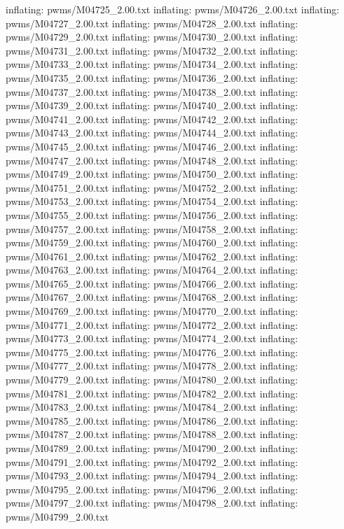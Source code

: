 \documentclass[letterpaper,10pt,english]{sphinxmanual}
\begin{document}
{\begin{sphinxVerbatim}[commandchars=\\\{\}]
  inflating: pwms/M04725\_2.00.txt
  inflating: pwms/M04726\_2.00.txt
  inflating: pwms/M04727\_2.00.txt
  inflating: pwms/M04728\_2.00.txt
  inflating: pwms/M04729\_2.00.txt
  inflating: pwms/M04730\_2.00.txt
  inflating: pwms/M04731\_2.00.txt
  inflating: pwms/M04732\_2.00.txt
  inflating: pwms/M04733\_2.00.txt
  inflating: pwms/M04734\_2.00.txt
  inflating: pwms/M04735\_2.00.txt
  inflating: pwms/M04736\_2.00.txt
  inflating: pwms/M04737\_2.00.txt
  inflating: pwms/M04738\_2.00.txt
  inflating: pwms/M04739\_2.00.txt
  inflating: pwms/M04740\_2.00.txt
  inflating: pwms/M04741\_2.00.txt
  inflating: pwms/M04742\_2.00.txt
  inflating: pwms/M04743\_2.00.txt
  inflating: pwms/M04744\_2.00.txt
  inflating: pwms/M04745\_2.00.txt
  inflating: pwms/M04746\_2.00.txt
  inflating: pwms/M04747\_2.00.txt
  inflating: pwms/M04748\_2.00.txt
  inflating: pwms/M04749\_2.00.txt
  inflating: pwms/M04750\_2.00.txt
  inflating: pwms/M04751\_2.00.txt
  inflating: pwms/M04752\_2.00.txt
  inflating: pwms/M04753\_2.00.txt
  inflating: pwms/M04754\_2.00.txt
  inflating: pwms/M04755\_2.00.txt
  inflating: pwms/M04756\_2.00.txt
  inflating: pwms/M04757\_2.00.txt
  inflating: pwms/M04758\_2.00.txt
  inflating: pwms/M04759\_2.00.txt
  inflating: pwms/M04760\_2.00.txt
  inflating: pwms/M04761\_2.00.txt
  inflating: pwms/M04762\_2.00.txt
  inflating: pwms/M04763\_2.00.txt
  inflating: pwms/M04764\_2.00.txt
  inflating: pwms/M04765\_2.00.txt
  inflating: pwms/M04766\_2.00.txt
  inflating: pwms/M04767\_2.00.txt
  inflating: pwms/M04768\_2.00.txt
  inflating: pwms/M04769\_2.00.txt
  inflating: pwms/M04770\_2.00.txt
  inflating: pwms/M04771\_2.00.txt
  inflating: pwms/M04772\_2.00.txt
  inflating: pwms/M04773\_2.00.txt
  inflating: pwms/M04774\_2.00.txt
  inflating: pwms/M04775\_2.00.txt
  inflating: pwms/M04776\_2.00.txt
  inflating: pwms/M04777\_2.00.txt
  inflating: pwms/M04778\_2.00.txt
  inflating: pwms/M04779\_2.00.txt
  inflating: pwms/M04780\_2.00.txt
  inflating: pwms/M04781\_2.00.txt
  inflating: pwms/M04782\_2.00.txt
  inflating: pwms/M04783\_2.00.txt
  inflating: pwms/M04784\_2.00.txt
  inflating: pwms/M04785\_2.00.txt
  inflating: pwms/M04786\_2.00.txt
  inflating: pwms/M04787\_2.00.txt
  inflating: pwms/M04788\_2.00.txt
  inflating: pwms/M04789\_2.00.txt
  inflating: pwms/M04790\_2.00.txt
  inflating: pwms/M04791\_2.00.txt
  inflating: pwms/M04792\_2.00.txt
  inflating: pwms/M04793\_2.00.txt
  inflating: pwms/M04794\_2.00.txt
  inflating: pwms/M04795\_2.00.txt
  inflating: pwms/M04796\_2.00.txt
  inflating: pwms/M04797\_2.00.txt
  inflating: pwms/M04798\_2.00.txt
  inflating: pwms/M04799\_2.00.txt

\end{sphinxVerbatim}}
\end{document}
